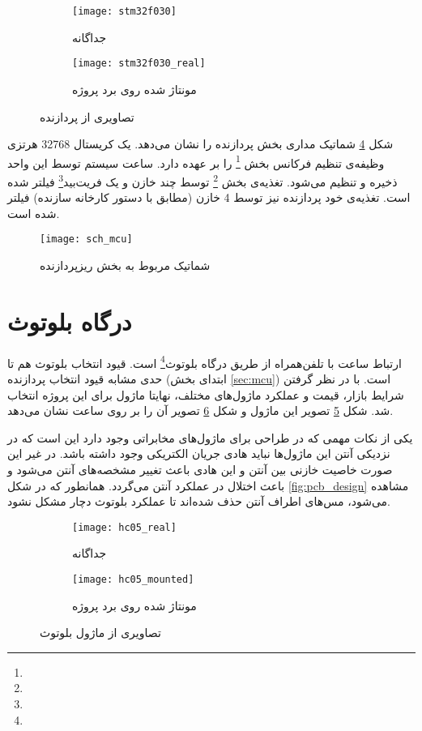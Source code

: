 \begin{figure}[h]
	\centering
	\begin{subfigure}{0.35\textwidth}
		\centering
		\texttt{[image: stm32f030]}
		\caption{جداگانه}
		\label{fig:stm32_image}
	\end{subfigure}
	\begin{subfigure}{0.35\textwidth}
		\centering
		\texttt{[image: stm32f030\_real]}
		\caption{مونتاژ شده روی برد پروژه}
		\label{fig:stm32_real}
	\end{subfigure}
	\caption{تصاویری از پردازنده }
	\label{fig:stm32}
\end{figure}

شکل \ref{fig:sch-mcu} شماتیک مداری بخش پردازنده را نشان می‌دهد. یک کریستال 32768 هرتزی وظیفه‌ی تنظیم فرکانس بخش
 \footnote{}
  را بر عهده دارد. ساعت سیستم توسط این واحد ذخیره و تنظیم می‌شود. تغذیه‌ی بخش 
  \footnote{}
  توسط چند خازن و یک فریت‌بید\footnote{} فیلتر شده است. تغذیه‌ی خود پردازنده نیز توسط 4 خازن (مطابق با دستور کارخانه سازنده) فیلتر شده است.

\begin{figure}
	\centering
	\texttt{[image: sch\_mcu]}
	\caption{شماتیک مربوط به بخش ریزپردازنده}
	\label{fig:sch-mcu}
\end{figure}

\section{درگاه بلوتوث}
ارتباط ساعت با تلفن‌همراه از طریق درگاه بلوتوث\footnote{} است. قیود انتخاب بلوتوث هم تا حدی مشابه قیود انتخاب پردازنده (ابتدای بخش \ref{sec:mcu}) است. با در نظر گرفتن شرایط بازار، قیمت و عملکرد ماژول‌های مختلف، نهایتا ماژول  برای این پروژه انتخاب شد. شکل \ref{fig:hc05_image} تصویر این ماژول و شکل \ref{fig:hc05_real} تصویر آن را بر روی \pcbf ساعت نشان می‌دهد.

یکی از نکات مهمی که در طراحی \pcbf برای ماژول‌های مخابراتی وجود دارد این است که در نزدیکی آنتن این ماژول‌ها نباید هادی جریان الکتریکی وجود داشته باشد. در غیر این صورت خاصیت خازنی بین آنتن و این هادی باعث تغییر مشخصه‌های آنتن می‌شود و باعث اختلال در عملکرد آنتن می‌گردد. همانطور که در شکل \ref{fig:pcb_design} مشاهده می‌شود، مس‌های اطراف آنتن  حذف شده‌اند تا عملکرد بلوتوث دچار مشکل نشود.

\begin{figure}[h]
	\centering
	\begin{subfigure}{0.4\textwidth}
		\centering
		\texttt{[image: hc05\_real]}
		\caption{جداگانه}
		\label{fig:hc05_image}
	\end{subfigure}
	\begin{subfigure}{0.5\textwidth}
		\centering
		\texttt{[image: hc05\_mounted]}
		\caption{مونتاژ شده روی برد پروژه}
		\label{fig:hc05_real}
	\end{subfigure}
	\caption{تصاویری از ماژول بلوتوث }
	\label{fig:hc05}
\end{figure}

